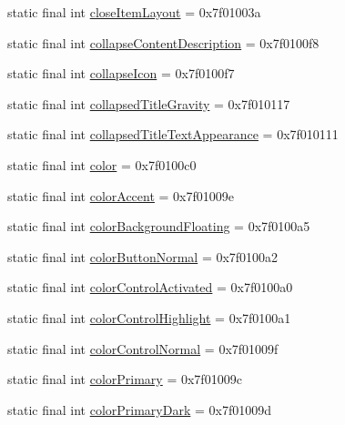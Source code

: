 \begin{CompactItemize}
\item 
static final int \hyperlink{classandroid_1_1support_1_1transition_1_1_r_1_1attr_3571a953f9dd706d6fccb48795fdb52c}{closeItemLayout} = 0x7f01003a
\item 
static final int \hyperlink{classandroid_1_1support_1_1transition_1_1_r_1_1attr_e76fc0159b61fc70756d2d7d17dc5c32}{collapseContentDescription} = 0x7f0100f8
\item 
static final int \hyperlink{classandroid_1_1support_1_1transition_1_1_r_1_1attr_d03465a33ebf42892815035e5d265007}{collapseIcon} = 0x7f0100f7
\item 
static final int \hyperlink{classandroid_1_1support_1_1transition_1_1_r_1_1attr_64131cf323422a85f661e0e8b619f9af}{collapsedTitleGravity} = 0x7f010117
\item 
static final int \hyperlink{classandroid_1_1support_1_1transition_1_1_r_1_1attr_34ceb92f81af9963f819eab027db2f16}{collapsedTitleTextAppearance} = 0x7f010111
\item 
static final int \hyperlink{classandroid_1_1support_1_1transition_1_1_r_1_1attr_bfa61d24695d37473e86b47505bc2892}{color} = 0x7f0100c0
\item 
static final int \hyperlink{classandroid_1_1support_1_1transition_1_1_r_1_1attr_5cb66ca0533d934bfdb5c997f01a40cc}{colorAccent} = 0x7f01009e
\item 
static final int \hyperlink{classandroid_1_1support_1_1transition_1_1_r_1_1attr_912e230f9a23b19cd9d3e098e124b32c}{colorBackgroundFloating} = 0x7f0100a5
\item 
static final int \hyperlink{classandroid_1_1support_1_1transition_1_1_r_1_1attr_2498878fd75a516a904bdf783a4e4923}{colorButtonNormal} = 0x7f0100a2
\item 
static final int \hyperlink{classandroid_1_1support_1_1transition_1_1_r_1_1attr_de1f4868abefef923eb740a483282a7b}{colorControlActivated} = 0x7f0100a0
\item 
static final int \hyperlink{classandroid_1_1support_1_1transition_1_1_r_1_1attr_6e7516e27d946740d5fe85ca928df605}{colorControlHighlight} = 0x7f0100a1
\item 
static final int \hyperlink{classandroid_1_1support_1_1transition_1_1_r_1_1attr_ec83bfa52774b6e79e3f126c7ae58a22}{colorControlNormal} = 0x7f01009f
\item 
static final int \hyperlink{classandroid_1_1support_1_1transition_1_1_r_1_1attr_359996328de40bdc3bc2ffa4a27733c4}{colorPrimary} = 0x7f01009c
\item 
static final int \hyperlink{classandroid_1_1support_1_1transition_1_1_r_1_1attr_62b9ee3497ca264761b19d1e363b0c3b}{colorPrimaryDark} = 0x7f01009d

\end{CompactItemize}
